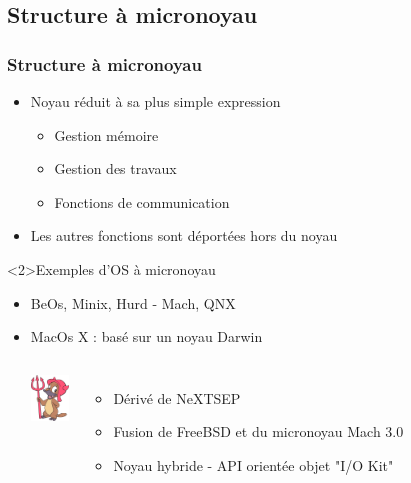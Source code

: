 \subsection{Structure à micronoyau}

\begin{frame}
\frametitle{Structure à micronoyau}
\begin{itemize}
\item Noyau réduit à sa plus simple expression
\begin{itemize}
\item Gestion mémoire
\item Gestion des travaux
\item Fonctions de communication
\end{itemize}
\item Les autres fonctions sont déportées hors du noyau
\end{itemize}
\begin{exampleblock}<2>{Exemples d'OS à micronoyau}
\begin{itemize}
\item BeOs, Minix, Hurd - Mach, QNX

\item MacOs X : basé sur un noyau Darwin
\begin{columns}
    \includegraphics[width=1cm]{../illustration/Darwin_logo.png}
  \begin{itemize}
    \item Dérivé de NeXTSEP
    \item Fusion de FreeBSD et du micronoyau Mach 3.0
    \item Noyau hybride - API orientée objet "I/O Kit"
  \end{itemize}
\end{columns}
\end{itemize}


\end{exampleblock}
\end{frame}


